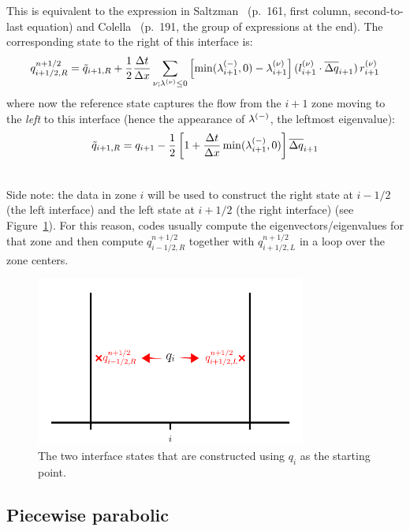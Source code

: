 This is equivalent to the expression in Saltzman~\cite{saltzman:1994}
(p.\ 161, first column, second-to-last equation) and
Colella~\cite{colella:1990} (p.\ 191, the group of expressions at the
end).  The corresponding state to the right of this interface is:
\begin{equation}
q_{i+1/2,R}^{n+1/2} = \tilde{q}_{i+1,R} + \frac{1}{2} \frac{\Delta t}{\Delta x}
       \sum_{\nu; \lambda^{(\nu)} \le 0} 
       \left [ \min(\lambda_{i+1}^{(-)},0) - \lambda_{i+1}^{(\nu)} \right ]
       (l_{i+1}^{(\nu)} \cdot \overline{\Delta q}_{i+1}) \, r_{i+1}^{(\nu)}
\end{equation}
where now the reference state captures the flow from the $i+1$ zone
moving to the {\em left} to this interface (hence the appearance of
$\lambda^{(-)}$, the leftmost eigenvalue):
\begin{equation}
\tilde{q}_{i+1,R} = q_{i+1} - \frac{1}{2} \left [ 1 + \frac{\Delta t}{\Delta x} \min(\lambda_{i+1}^{(-)},0) \right ] \overline{\Delta q}_{i+1}
\end{equation}

\ \\

Side note: the data in zone $i$ will be used to construct the right
state at $i-1/2$ (the left interface) and the left state at $i+1/2$
(the right interface) (see Figure~\ref{fig:states}).  For this reason,
codes usually compute the eigenvectors/eigenvalues for that zone and
then compute $q_{i-1/2,R}^{n+1/2}$ together with $q_{i+1/2,L}^{n+1/2}$
in a loop over the zone centers.

\begin{figure}
\centering
\includegraphics[width=3.5in]{states}
\caption[The two interface states derived from a cell-center quantity.]{\label{fig:states} The two interface states that are constructed
using $q_i$ as the starting point.}
\end{figure}

\subsection{Piecewise parabolic}

